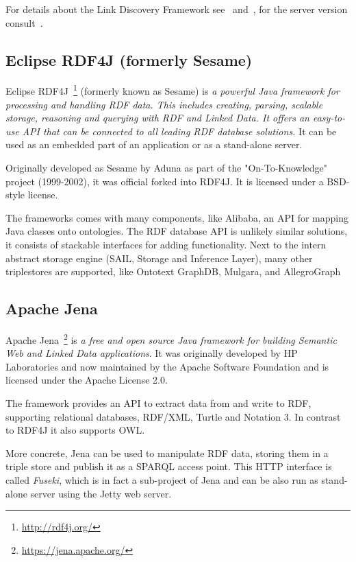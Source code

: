 For details about the Link Discovery Framework see~\cite{volz2009silk} and~\cite{jentzsch2010silk}, for the server version consult~\cite{isele2010silk}.

\subsection{Eclipse RDF4J (formerly Sesame)}
Eclipse RDF4J~\footnote{\url{http://rdf4j.org/}} (formerly known as Sesame) is \emph{a powerful Java framework for processing and handling RDF data. This includes creating, parsing, scalable storage, reasoning and querying with RDF and Linked Data. It offers an easy-to-use API that can be connected to all leading RDF database solutions.} It can be used as an embedded part of an application or as a stand-alone server.

Originally developed as Sesame by Aduna as part of the "On-To-Knowledge" project (1999-2002), it was official forked into RDF4J. It is licensed under a BSD-style license.

The frameworks comes with many components, like Alibaba, an API for mapping Java classes onto ontologies. The RDF database API is unlikely similar solutions, it consists of stackable interfaces for adding functionality. Next to the intern abstract storage engine (SAIL, Storage and Inference Layer), many other triplestores are supported, like  Ontotext GraphDB, Mulgara, and AllegroGraph

\subsection{Apache Jena}

Apache Jena~\footnote{\url{https://jena.apache.org/}} is \emph{a free and open source Java framework for building Semantic Web and Linked Data applications}. It was originally developed by HP Laboratories and now maintained by the Apache Software Foundation and is licensed under the Apache License 2.0.

The framework provides an API to extract data from and write to RDF, supporting relational databases, RDF/XML, Turtle and Notation 3. In contrast to RDF4J it also supports OWL.

More concrete, Jena can be used to manipulate RDF data, storing them in a triple store and publish it as a SPARQL access point. This HTTP interface is called \emph{Fuseki}, which is in fact a sub-project of Jena and can be also run as stand-alone server using the Jetty web server.

